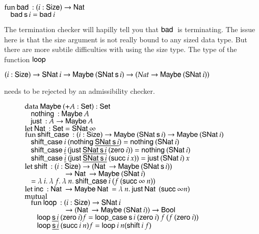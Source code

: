 \begin{bsp}
$\fun \bad : \EPi{i}{\Size}{\Nat}$\\
$\spc \bad \s i = \bad i $ 
\end{bsp}
The termination checker will hapilly tell you that $\bad$ is terminating.
The issue here is that the size argument is not really bound to any sized data type.
But there are more subtile difficulties with using the size type.
The type of the function $\lop$
\begin{bsp}
$\EPi{i}{\Size}{\SNat i \ra \Maybe (\SNat \s i) \ra (Nat \ra \Maybe (\SNat i))} $ 
\end{bsp}
needs to be rejected by an admissibility checker.
\begin{figure}[p]
$\data \Maybe ( + A : \Set ) : \Set$\\
$\spc  \nothing : \Maybe A$\\
$\spc  \just : A \ra\Maybe A$\\

$\clet \Nat : \Set = \SNat \infty$\\

$\fun \shiftcase : (i : \Size) \ra\Maybe (\SNat \s i) \ra\Maybe (\SNat i)$\\
$\spc \shiftcase i \: (\nothing \inacc{\SNat \s i}) = \nothing (\SNat i)$\\
$\spc \shiftcase \inacc{i} \: (\just \inacc{\SNat \s i} \: (\zero i)) = \nothing (\SNat i)$\\
$\spc \shiftcase \inacc{i} \: (\just \inacc{\SNat \s i} \: (\suc i \: x)) = \just (\SNat i) \: x$\\

$\clet \shift : (i : \Size) \ra(\Nat \ra \Maybe (\SNat \s i)) $\\
$\spcx \spcx \ra\Nat \ra \Maybe (\SNat i) $\\ 
$\spc = \lam{i}{\lam{f}{\lam{n}{\shiftcase i \: (f \: (\suc \infty \: n))}}}$\\

$\clet \inc : \Nat \ra \Maybe \Nat = \lam{n}{\just \Nat \: (\suc \infty n)}$\\

$\mutual$\\
$\spc \fun \lop : (i : \Size ) \ra \SNat i $\\
$\spcx \spcx \ra (\Nat \ra\Maybe (\SNat i)) \ra\Bool$\\
$\spc \spc \lop \inacc{\s i} \: (\zero i) f = \lopcase \s i \: (\zero i) \: f \: (f \: (\zero i))$\\
$\spc \spc \lop \inacc{\s i} \: (\suc i \: n) f = \lop i \: n (\shift i \: f)$\\


\end{figure}
